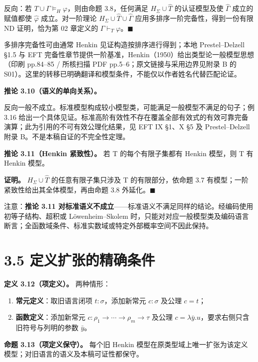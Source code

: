 \documentclass[UTF8,a4paper,zihao=-4,fontset=windows,openany]{ctexbook}
\newcommand{\mcsdisplay}[1]{%
  \par\addvspace{0.7em}%
  \sbox{\mcsmathbox}{\ensuremath{\displaystyle #1}}%
  \ifdim\wd\mcsmathbox>\linewidth
    \noindent\resizebox{\linewidth}{!}{\usebox{\mcsmathbox}}%
  \else
    \noindent\hspace*{\fill}\usebox{\mcsmathbox}\hspace*{\fill}%
  \fi
  \par\addvspace{0.7em}%
}
\def\ensuremath#1{#1}%
\begin{document}
反向：若 \(T\cup\Gamma\vDash_H\varphi\)，则由命题 3.8，任何满足 \(H_\Sigma\cup \hat{T}\) 的认证模型及使 \(\hat{\Gamma}\) 成立的赋值都使 \(\hat{\varphi}\) 成立。对一阶理论 \(H_\Sigma\cup\widehat T\cup\widehat\Gamma\) 应用多排序一阶完备性，得到一份有限 ND 证明，恰为第 02 章定义的 \(\Gamma\vdash_T\varphi\)。\(\blacksquare\)

多排序完备性可由通常 Henkin 见证构造按排序进行得到；本地 Prestel–Delzell §1.5 与 EFT 完备性章节提供一阶基准，Henkin（1950）给出类型论一般模型思想（印刷 pp.84–85 / 所核扫描 PDF pp.5–6；原文链接与采用边界见附录 B 的 S01）。这里的转移已明确翻译和模型条件，不能仅以作者姓名代替匹配论证。

\textbf{推论 3.10（语义的单向关系）。}


\mcsdisplay{T\models_H\varphi\ \Longrightarrow\ T\models_{\rm std}\varphi.}
\noindent 反向一般不成立。标准模型构成较小模型类，可能满足一般模型不满足的句子；例 3.16 给出一个具体见证。标准高阶有效性不存在覆盖全部有效式的有效可靠完备演算；此为引用的不可有效公理化结果，见 EFT IX §1、X §5 及 Prestel–Delzell 附录 B。不是本稿自证的不完全性定理。

\textbf{推论 3.11（Henkin 紧致性）。} 若 T 的每个有限子集都有 Henkin 模型，则 T 有 Henkin 模型。

\textbf{证明。} \(H_\Sigma\cup \hat{T}\) 的任意有限子集只涉及 T 的有限部分，依命题 3.7 有模型；一阶紧致性给出其全体模型，再由命题 3.8 外延化。\(\blacksquare\)

注意：\textbf{推论 3.11 对标准语义不成立}——标准语义不满足同样的结论。经编码使用初等子结构、超积或 Löwenheim–Skolem 时，只能对对应一般模型类及编码语言断言；全函数域条件、标准实数域或特定外部概率空间不因此保持。

\section{3.5 定义扩张的精确条件}
\textbf{定义 3.12（项定义）。} 两种情形：

\begin{enumerate}
\item \textbf{常元定义}：取旧语言闭项 \(t:\sigma\)，添加新常元 \(c:\sigma\) 及公理 \(c=t\)；
\item \textbf{函数定义}：添加新常元 \(c:\rho_1\to\cdots\to\rho_m\to\tau\) 及公理 \(c=\lambda\bar y.u\)，要求右侧只含旧符号与列明的参数 \(\bar y\)。
\end{enumerate}
\textbf{命题 3.13（项定义保守）。} 每个旧 Henkin 模型在原类型域上唯一扩张为该定义模型；对旧语言的语义及本稿可证性都保守。
\end{document}
